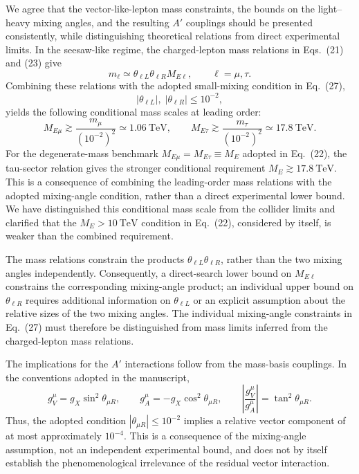 \documentclass[12pt,a4paper]{article}
\begin{document}

We agree that the vector-like-lepton mass constraints, the bounds on the light--heavy mixing angles, and the resulting \(A'\) couplings should be presented consistently, while distinguishing theoretical relations from direct experimental limits. In the seesaw-like regime, the charged-lepton mass relations in Eqs.~(21) and (23) give
\[
m_\ell\simeq\theta_{\ell L}\theta_{\ell R}M_{E\ell},
\qquad \ell=\mu,\tau.
\]
Combining these relations with the adopted small-mixing condition in Eq.~(27),
\[
|\theta_{\ell L}|,\;|\theta_{\ell R}|\leq10^{-2},
\]
yields the following conditional mass scales at leading order:
\[
M_{E\mu}\gtrsim
\frac{m_\mu}{(10^{-2})^2}
\simeq1.06~\mathrm{TeV},
\qquad
M_{E\tau}\gtrsim
\frac{m_\tau}{(10^{-2})^2}
\simeq17.8~\mathrm{TeV}.
\]
For the degenerate-mass benchmark \(M_{E\mu}=M_{E\tau}\equiv M_E\) adopted in Eq.~(22), the tau-sector relation gives the stronger conditional requirement \(M_E\gtrsim17.8~\mathrm{TeV}\). This is a consequence of combining the leading-order mass relations with the adopted mixing-angle condition, rather than a direct experimental lower bound. We have distinguished this conditional mass scale from the collider limits and clarified that the \(M_E>10~\mathrm{TeV}\) condition in Eq.~(22), considered by itself, is weaker than the combined requirement.

The mass relations constrain the products \(\theta_{\ell L}\theta_{\ell R}\), rather than the two mixing angles independently. Consequently, a direct-search lower bound on \(M_{E\ell}\) constrains the corresponding mixing-angle product; an individual upper bound on \(\theta_{\ell R}\) requires additional information on \(\theta_{\ell L}\) or an explicit assumption about the relative sizes of the two mixing angles. The individual mixing-angle constraints in Eq.~(27) must therefore be distinguished from mass limits inferred from the charged-lepton mass relations.

The implications for the \(A'\) interactions follow from the mass-basis couplings. In the conventions adopted in the manuscript,
\[
g_V^\mu=g_X\sin^2\theta_{\mu R},
\qquad
g_A^\mu=-g_X\cos^2\theta_{\mu R},
\qquad
\left|\frac{g_V^\mu}{g_A^\mu}\right|
=\tan^2\theta_{\mu R}.
\]
Thus, the adopted condition \(|\theta_{\mu R}|\leq10^{-2}\) implies a relative vector component of at most approximately \(10^{-4}\). This is a consequence of the mixing-angle assumption, not an independent experimental bound, and does not by itself establish the phenomenological irrelevance of the residual vector interaction.
\end{document}
